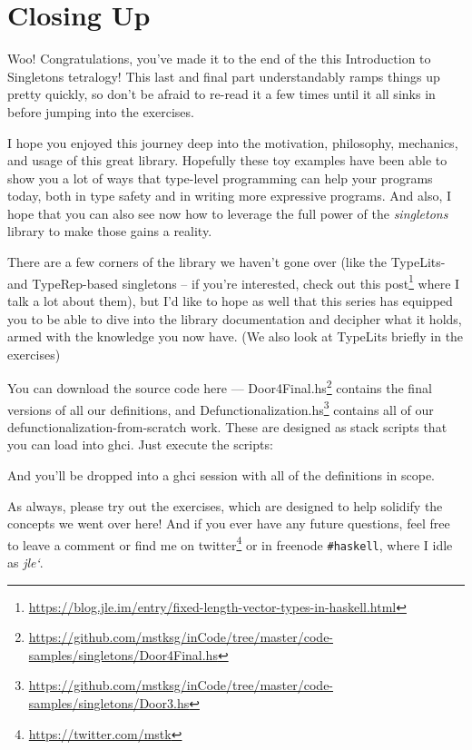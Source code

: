 \documentclass[]{article}
\newenvironment{Shaded}{}{}
\newcommand{\ExtensionTok}[1]{#1}
\newcommand{\NormalTok}[1]{#1}
\newcommand{\OperatorTok}[1]{\textcolor[rgb]{0.40,0.40,0.40}{#1}}
\renewcommand{\href}[2]{#2\footnote{\url{#1}}}
\begin{document}
\section{Closing Up}\label{closing-up}

Woo! Congratulations, you've made it to the end of the this Introduction to
Singletons tetralogy! This last and final part understandably ramps things up
pretty quickly, so don't be afraid to re-read it a few times until it all sinks
in before jumping into the exercises.

I hope you enjoyed this journey deep into the motivation, philosophy, mechanics,
and usage of this great library. Hopefully these toy examples have been able to
show you a lot of ways that type-level programming can help your programs today,
both in type safety and in writing more expressive programs. And also, I hope
that you can also see now how to leverage the full power of the
\emph{singletons} library to make those gains a reality.

There are a few corners of the library we haven't gone over (like the TypeLits-
and TypeRep-based singletons -- if you're interested, check out
\href{https://blog.jle.im/entry/fixed-length-vector-types-in-haskell.html}{this
post} where I talk a lot about them), but I'd like to hope as well that this
series has equipped you to be able to dive into the library documentation and
decipher what it holds, armed with the knowledge you now have. (We also look at
TypeLits briefly in the exercises)

You can download the source code here ---
\href{https://github.com/mstksg/inCode/tree/master/code-samples/singletons/Door4Final.hs}{Door4Final.hs}
contains the final versions of all our definitions, and
\href{https://github.com/mstksg/inCode/tree/master/code-samples/singletons/Door3.hs}{Defunctionalization.hs}
contains all of our defunctionalization-from-scratch work. These are designed as
stack scripts that you can load into ghci. Just execute the scripts:

\begin{Shaded}
\end{Shaded}

And you'll be dropped into a ghci session with all of the definitions in scope.

As always, please try out the exercises, which are designed to help solidify the
concepts we went over here! And if you ever have any future questions, feel free
to leave a comment or find me on \href{https://twitter.com/mstk}{twitter} or in
freenode \texttt{\#haskell}, where I idle as \emph{jle`}.
\end{document}
